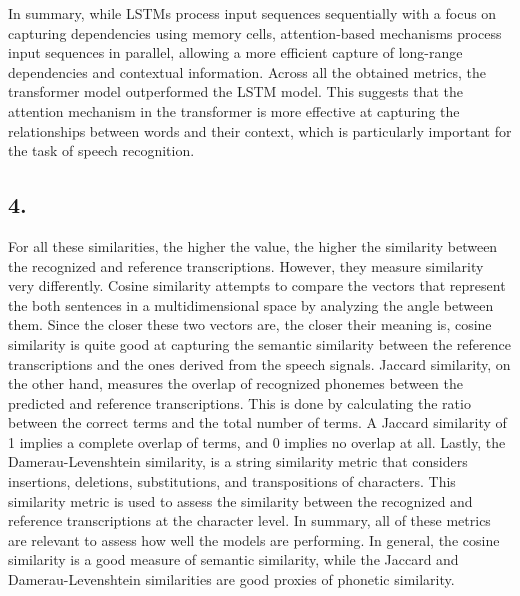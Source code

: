 \documentclass[11pt]{article}
\begin{document}
In summary, while LSTMs process input sequences sequentially with a focus on capturing dependencies using memory cells, attention-based mechanisms process input sequences in parallel, allowing a more efficient capture of long-range dependencies and contextual information. Across all the obtained metrics, the transformer model outperformed the LSTM model. This suggests that the attention mechanism in the transformer is more effective at capturing the relationships between words and their context, which is particularly important for the task of speech recognition.

\subsection*{4.}

For all these similarities, the higher the value, the higher the similarity between the recognized and reference transcriptions. However, they measure similarity very differently. Cosine similarity attempts to compare the vectors that represent the both sentences in a multidimensional space by analyzing the angle between them. Since the closer these two vectors are, the closer their meaning is, cosine similarity is quite good at capturing the semantic similarity between the reference transcriptions and the ones derived from the speech signals. Jaccard similarity, on the other hand, measures the overlap of recognized phonemes between the predicted and reference transcriptions. This is done by calculating the ratio between the correct terms and the total number of terms. A Jaccard similarity of 1 implies a complete overlap of terms, and 0 implies no overlap at all. Lastly, the Damerau-Levenshtein similarity, is a string similarity metric that considers insertions, deletions, substitutions, and transpositions of characters. This similarity metric is used to assess the similarity between the recognized and reference transcriptions at the character level. In summary, all of these metrics are relevant to assess how well the models are performing. In general, the cosine similarity is a good measure of semantic similarity, while the Jaccard and Damerau-Levenshtein similarities are good proxies of phonetic similarity.
\end{document}
